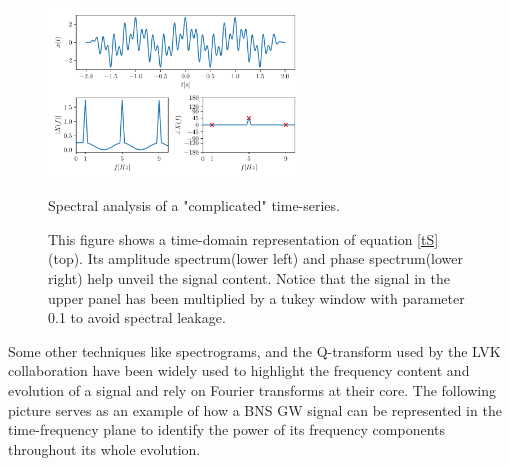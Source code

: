 \begin{figure}[hbt!]
\begin{center}
\includegraphics[width=0.6\textwidth, angle=0]{images/Data_analysis/sig_proc/2_1.pdf}
\captionsetup{width=0.8\textwidth}
\caption{Spectral analysis of a "complicated" time-series.}
\caption*{This figure shows a time-domain representation of equation \ref{tS}(top). Its amplitude spectrum(lower left) and phase spectrum(lower right) help unveil the signal content. Notice that the signal in the upper panel has been multiplied by a tukey window with parameter 0.1 to avoid spectral leakage.}
\label{fig:1}
\end{center}
\end{figure}

\FloatBarrier



Some other techniques like spectrograms, and the Q-transform used by the LVK collaboration \cite{LIGOScientific:2017vwq} have been widely used to highlight the frequency content and evolution of a signal and rely on Fourier transforms at their core. The following picture serves as an example of how a BNS GW signal can be represented in the time-frequency plane to identify the power of its frequency components throughout its whole evolution.


